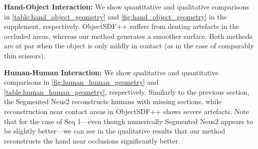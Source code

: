 \par
\noindent \textbf{Hand-Object Interaction:} 
We show quantitative and qualitative comparisons in \cref{table:hand_object_geometry} and  \cref{fig:hand_object_geometry} in the supplement, respectively. 
ObjectSDF++ suffers from denting artefacts in the occluded areas, whereas our method generates a smoother surface. 
Both methods are at par when the object is only mildly in contact (as in the case of comparably thin scissors). 
\par
\noindent \textbf{Human-Human Interaction:} We show qualitative and quantitative comparisons in \cref{fig:human_human_geometry} 
and \cref{table:human_human_geometry}, respectively. 
Similarly to the previous section, the Segmented Neus2 reconstructs humans with missing sections, while reconstruction near contact areas in ObjectSDF++ shows severe artefacts. 
Note that for the case of Seq 1---even though numerically Segmented Neus2 appears to be slightly better---we can see in the qualitative results that our method reconstructs the hand near occlusions significantly better. 


